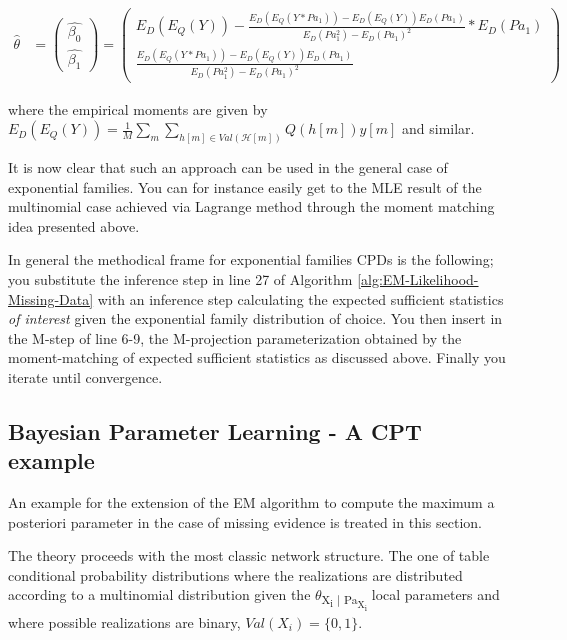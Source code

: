 \documentclass[11pt]{article}
\begin{document}
\begin{article}
 \begin{align}
 \hat{\theta} &= \begin{pmatrix}
                 \hat{\beta_0}\\
		 \hat{\beta_1}
           \end{pmatrix} 
        = \begin{pmatrix}
		 E_D(E_Q(Y)) - \frac{E_D(E_Q(Y*Pa_1))- E_D(E_Q(Y))E_D(Pa_1)}{E_D(Pa_1^2) - E_D(Pa_1)^2} * E_D(Pa_1)\\
		 \frac{E_D(E_Q(Y*Pa_1))- E_D(E_Q(Y))E_D(Pa_1)}{E_D(Pa_1^2) - E_D(Pa_1)^2}
           \end{pmatrix}
\end{align}

where the empirical moments are given by \(E_D(E_Q(Y)) = \frac{1}{M}
    \sum_m \sum_{h[m] \in Val(\mathscr{H}[m])} Q(h[m]) y[m]\) and
similar.    

It is now clear that such an approach can be used in the general
case of exponential families. You can for instance easily get to
the MLE result of the multinomial case achieved via Lagrange method
through the moment matching idea presented above.

In general the methodical frame for exponential families CPDs is
the following; you substitute the inference step in line 27 of
Algorithm \ref{alg:EM-Likelihood-Missing-Data} with an inference step
calculating the expected sufficient statistics \emph{of interest} given
the exponential family distribution of choice. You then insert in
the M-step of line 6-9, the M-projection parameterization obtained
by the moment-matching of expected sufficient statistics as
discussed above. Finally you iterate until convergence.

\subsection{Bayesian Parameter Learning - A CPT example}
\label{cpt:cpt_bayes_learning}
An example for the extension of the EM algorithm to compute the
maximum a posteriori parameter in the case of missing evidence is
treated in this section.

The theory proceeds with the most classic network structure. The
one of table conditional probability distributions where the
realizations are distributed according to a multinomial
distribution given the \(\theta\)\textsubscript{X\textsubscript{i} | Pa\textsubscript{X\textsubscript{i}}} local parameters and
where possible realizations are binary, \(Val(X_i) = \{0,1 \}\).


\end{article}
\end{document}
